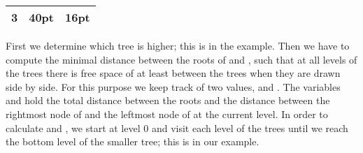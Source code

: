 \begin{Figure}
\begin{tabular}{|c|r|r|}
3&40pt&16pt\\                                                                
\hline                                                                          
\end{tabular}                                                                   
\caption{The \TeX{}trees  and~ are combined to form the
larger \TeX{}\-tree~. The small table gives the 
history of computation for  and .}                  
\label{AddInfo}                                                                 
\end{Figure}                                                                    

                                                                                
First we determine which tree is higher; this is                                
 in the example.                                                         
Then we have to compute the minimal distance                                    
between the roots of  and , such that at all levels               
of the trees there is free space of at least  between               
the trees when they are drawn side by side.                                     
For this purpose we keep track of two values,  and                  
. The variables  and                      
hold the total distance between the roots and the distance                      
between the rightmost node of  and the leftmost node                     
of  at the current level. In order to calculate                          
 and , we start at level 0 and                         
visit each level of the trees until we reach the bottom level                   
of the smaller tree; this is  in our example.                            
                                                                                
